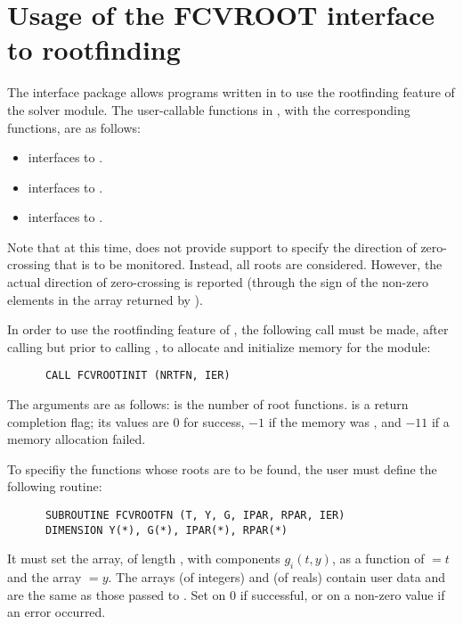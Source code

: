 \section{Usage of the FCVROOT interface to rootfinding}

The {\fcvroot} interface package allows programs written in {\F} to
use the rootfinding feature of the {\cvode} solver module.
The user-callable functions in {\fcvroot}, with the corresponding
{\cvode} functions, are as follows: 
\begin{itemize}
  \item {} interfaces to .
  \item {} interfaces to .
  \item {} interfaces to .
\end{itemize}
Note that at this time, {\fcvroot} does not provide support to
specify the direction of zero-crossing that is to be monitored. 
Instead, all roots are considered. However, the actual direction
of zero-crossing is reported (through the sign of the non-zero
elements in the array  returned by ).

In order to use the rootfinding feature of {\cvode}, the following
call must be made, after calling  but prior to calling
, to allocate and initialize memory for the  module:
\begin{verbatim}
      CALL FCVROOTINIT (NRTFN, IER)
\end{verbatim}
The arguments are as follows:
 is the number of root functions.
 is a return completion flag; its values are $0$ for success, $-1$ 
if the  memory was , and $-11$ if a memory allocation failed.

To specifiy the functions whose roots are to be found, the user must
define the following routine:
\begin{verbatim}
      SUBROUTINE FCVROOTFN (T, Y, G, IPAR, RPAR, IER)
      DIMENSION Y(*), G(*), IPAR(*), RPAR(*)
\end{verbatim}
It must set the  array, of length , with components $g_i(t,y)$,
as a function of  $= t$ and the array  $= y$.  
The arrays  (of integers) and  (of reals) contain user data
and are the same as those passed to .
Set  on 0 if successful, or on a non-zero value if an error occurred.


